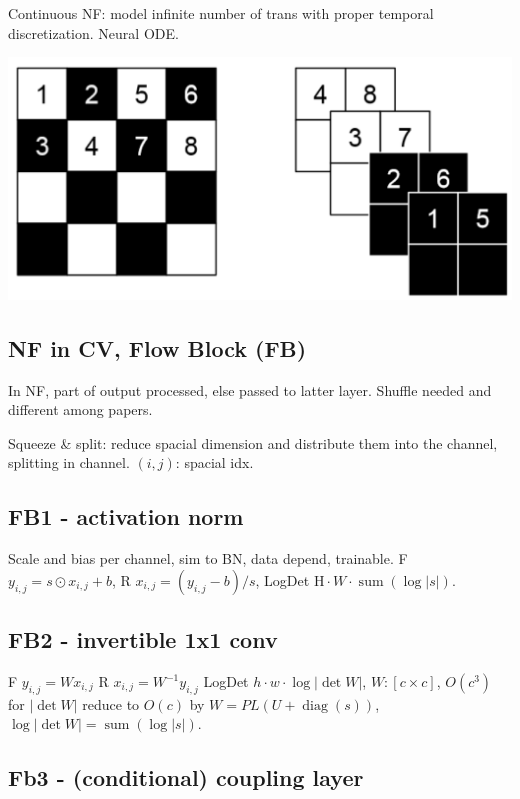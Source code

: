 Continuous NF: model infinite number of trans with proper temporal discretization. Neural ODE.

\begin{center}
    \includegraphics[width=0.8\columnwidth]{figures/coupling_layer.png}
\end{center}

\subsection*{NF in CV, Flow Block (FB)}

In NF, part of output processed, else passed to latter layer. Shuffle needed and different among papers.

Squeeze \& split: reduce spacial dimension and distribute them into the channel, splitting in channel. \((i,j)\): spacial idx.

\subsection*{FB1 - activation norm}
Scale and bias per channel, sim to BN, data depend, trainable.
\textsf{F} \( y_{i, j}={s} \odot x_{i, j}+{b}\),
\textsf{R} \( {x}_{i, j}=({y}_{i, j}-{b}) / {s}\),
\textsf{LogDet} \(\mathrm{H} \cdot W \cdot \operatorname{sum}(\log |s|)\).

\subsection*{FB2 - invertible 1x1 conv}

\textsf{F} \({y}_{i, j}={W} {x}_{i, j}\)
\textsf{R} \({x}_{i, j}={W}^{-1} {y}_{i, j}\)
\textsf{LogDet} \(h \cdot w \cdot \log |\operatorname{det}{W}|\), \({W}:[c \times c]\),
\(O(c^3)\) for \(|\operatorname{det}{W}|\)  reduce to \(O(c)\) by \({W}={P L}({U}+\operatorname{diag}({s}))\), \(\log |\operatorname{det}{W}|=\operatorname{sum}(\log |{s}|)\).


\subsection*{Fb3 - (conditional) coupling layer}

